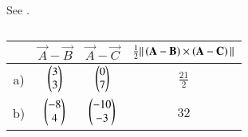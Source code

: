     See .
\begin{table}[!ht]
    \centering
    \caption{}
    \label{eq:10/7/3/1/area}
    \begin{tabular}{|c|c|c|c|}
        \hline
	     & $\vec{A}-\vec{B}$  & $\vec{A}-\vec{C}$  & $\frac{1}{2}\|\left(\mathbf{A}-\mathbf{B}\right) \times \left(\mathbf{A}-\mathbf{C}\right)\|$ \\
        \hline
         a)& $\begin{pmatrix} 3 \\3 \end{pmatrix}$ & $\begin{pmatrix} 0 \\ 7 \end{pmatrix}$ & $\frac{21}{2}$ \\
        \hline
	    b)& $\begin{pmatrix}
 -8 \\
 4 
 \end{pmatrix}$
         &$\begin{pmatrix}
 -10 \\
 -3 
 \end{pmatrix}$
  &  $32$   \\
        \hline
    \end{tabular}
\end{table}

